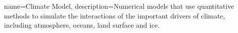 \makeglossaries

{
    name=Climate Model,
    description={Numerical models that use quantitative methods to simulate the interactions of the important drivers of climate, including atmosphere, oceans, land surface and ice.}
}